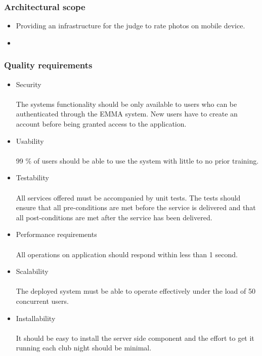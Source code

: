 \documentclass[10pt,a4paper]{article}
\begin{document}
\subsubsection{Architectural scope}
\begin{itemize}
\item Providing an infrastructure for the judge to rate photos on mobile device.
\item 
\end{itemize}
\subsubsection{Quality requirements}
\begin{itemize}
\item Security
\paragraph{}
The systems functionality should be only available to users who can be authenticated through the EMMA system. New users have to create an account before being granted access to the application.
\item Usability
\paragraph{}
99 \% of users should be able to use the system with little to no prior training.
\item Testability
\paragraph{}
All services offered must be accompanied by unit tests. The tests should ensure that all pre-conditions are met before the service is delivered and that all post-conditions are met after the service has been delivered.
\item Performance requirements
\paragraph{}
 All operations on application should respond within less than 1 second.
\item Scalability
\paragraph{}
The deployed system must be able to operate effectively under the load of 50 concurrent users.
\item Installability
\paragraph{}
It should be easy to install the server side component and the effort to get it running each club night should be minimal.
\end{itemize}
\end{document}
